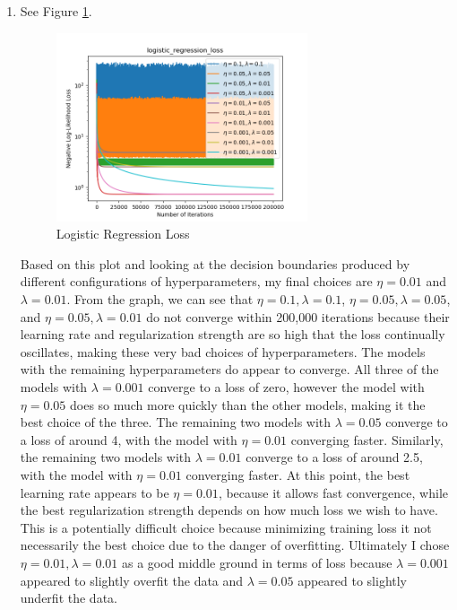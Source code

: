 \documentclass[submit]{harvardml}
\begin{document}
\begin{enumerate}
	\item See Figure \ref{fig:logistic_regression_loss}.
		\begin{figure}[h]
			\centering
			\includegraphics[width=0.7\textwidth]{logistic_regression_loss}
			\caption{Logistic Regression Loss}
			\label{fig:logistic_regression_loss}
		\end{figure}
	
	Based on this plot and looking at the decision boundaries produced by different configurations of hyperparameters, my final choices are $\eta = 0.01$ and $\lambda=0.01$. From the graph, we can see that $\eta=0.1, \lambda=0.1$, $\eta=0.05,\lambda=0.05$, and $\eta=0.05, \lambda=0.01$ do not converge within 200,000 iterations because their learning rate and regularization strength are so high that the loss continually oscillates, making these very bad choices of hyperparameters. The models with the remaining hyperparameters do appear to converge. All three of the models with $\lambda = 0.001$ converge to a loss of zero, however the model with $\eta=0.05$ does so much more quickly than the other models, making it the best choice of the three. The remaining two models with $\lambda=0.05$ converge to a loss of around 4, with the model with $\eta =0.01$ converging faster. Similarly, the remaining two models with $\lambda=0.01$ converge to a loss of around 2.5, with the model with $\eta =0.01$ converging faster. At this point, the best learning rate appears to be $\eta = 0.01$, because it allows fast convergence, while the best regularization strength depends on how much loss we wish to have. This is a potentially difficult choice because minimizing training loss it not necessarily the best choice due to the danger of overfitting. Ultimately I chose $\eta = 0.01, \lambda = 0.01$ as a good middle ground in terms of loss because $\lambda = 0.001$ appeared to slightly overfit the data and $\lambda = 0.05$ appeared to slightly underfit the data.
	

\end{enumerate}
\end{document}
